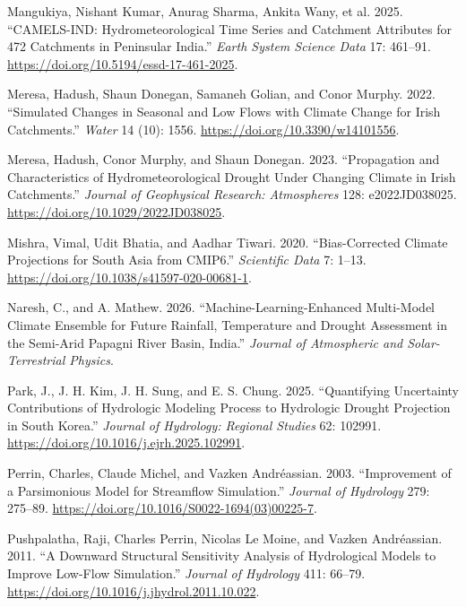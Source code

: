 \documentclass[
  11pt,
]{article}
\newlength{\cslhangindent}
\newenvironment{CSLReferences}[2] %
 {\begin{list}{}{%
  \setlength{\itemindent}{0pt}
  \setlength{\leftmargin}{0pt}
  \setlength{\parsep}{0pt}
  \ifodd #1
   \setlength{\leftmargin}{\cslhangindent}
   \setlength{\itemindent}{-1\cslhangindent}
  \fi
  \setlength{\itemsep}{#2\baselineskip}}}
 {\end{list}}
\begin{document}
\begin{CSLReferences}{1}{1}
{Mangukiya, Nishant Kumar, Anurag Sharma, Ankita Wany, et al.} 2025.
{``{CAMELS-IND}: Hydrometeorological Time Series and Catchment
Attributes for 472 Catchments in Peninsular India.''} \emph{Earth System
Science Data} 17: 461--91.
\url{https://doi.org/10.5194/essd-17-461-2025}.

Meresa, Hadush, Shaun Donegan, Samaneh Golian, and Conor Murphy. 2022.
{``Simulated Changes in Seasonal and Low Flows with Climate Change for
{Irish} Catchments.''} \emph{Water} 14 (10): 1556.
\url{https://doi.org/10.3390/w14101556}.

Meresa, Hadush, Conor Murphy, and Shaun Donegan. 2023. {``Propagation
and Characteristics of Hydrometeorological Drought Under Changing
Climate in {Irish} Catchments.''} \emph{Journal of Geophysical Research:
Atmospheres} 128: e2022JD038025.
\url{https://doi.org/10.1029/2022JD038025}.

Mishra, Vimal, Udit Bhatia, and Aadhar Tiwari. 2020. {``Bias-Corrected
Climate Projections for {South Asia} from {CMIP6}.''} \emph{Scientific
Data} 7: 1--13. \url{https://doi.org/10.1038/s41597-020-00681-1}.

Naresh, C., and A. Mathew. 2026. {``Machine-Learning-Enhanced
Multi-Model Climate Ensemble for Future Rainfall, Temperature and
Drought Assessment in the Semi-Arid {Papagni River} Basin, {India}.''}
\emph{Journal of Atmospheric and Solar-Terrestrial Physics}.

Park, J., J. H. Kim, J. H. Sung, and E. S. Chung. 2025. {``Quantifying
Uncertainty Contributions of Hydrologic Modeling Process to Hydrologic
Drought Projection in {South Korea}.''} \emph{Journal of Hydrology:
Regional Studies} 62: 102991.
\url{https://doi.org/10.1016/j.ejrh.2025.102991}.

Perrin, Charles, Claude Michel, and Vazken Andréassian. 2003.
{``Improvement of a Parsimonious Model for Streamflow Simulation.''}
\emph{Journal of Hydrology} 279: 275--89.
\url{https://doi.org/10.1016/S0022-1694(03)00225-7}.

Pushpalatha, Raji, Charles Perrin, Nicolas Le Moine, and Vazken
Andréassian. 2011. {``A Downward Structural Sensitivity Analysis of
Hydrological Models to Improve Low-Flow Simulation.''} \emph{Journal of
Hydrology} 411: 66--79.
\url{https://doi.org/10.1016/j.jhydrol.2011.10.022}.


\end{CSLReferences}
\end{document}
